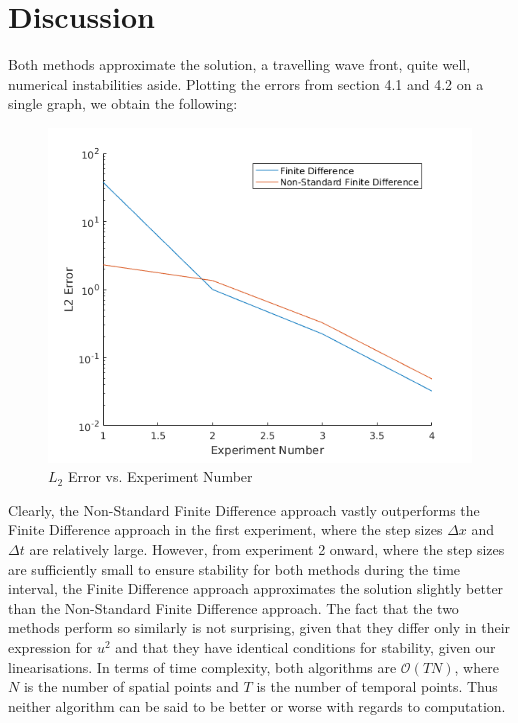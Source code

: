 \documentclass[a4paper]{article}
\begin{document}
\section{Discussion}\label{sec:discussion}
    Both methods approximate the solution, a travelling wave front, quite well, numerical instabilities aside.
    \newline
    Plotting the errors from section 4.1 and 4.2 on a single graph, we obtain the following:
    \begin{figure}[H]
    \caption{$L_{2}$ Error vs. Experiment Number}
    \includegraphics[scale=0.7]{ErrorComparison.png}
    \end{figure}
    Clearly, the Non-Standard Finite Difference approach vastly outperforms the Finite Difference approach in the first experiment, where the step sizes $\Delta x$ and $\Delta t$ are relatively large. However, from experiment 2 onward, where the step sizes are sufficiently small to ensure stability for both methods during the time interval, the Finite Difference approach approximates the solution slightly better than the Non-Standard Finite Difference approach. The fact that the two methods perform so similarly is not surprising, given that they differ only in their expression for $u^2$ and that they have identical conditions for stability, given our linearisations.
    \newline
    In terms of time complexity, both algorithms are $\mathcal{O}(TN)$, where $N$ is the number of spatial points and $T$ is the number of temporal points. Thus neither algorithm can be said to be better or worse with regards to computation. 
    \newpage
\end{document}
